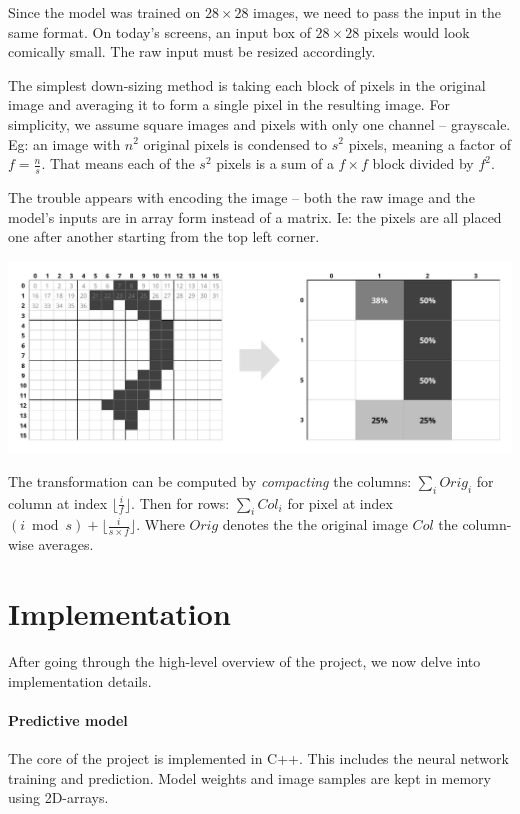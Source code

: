 \documentclass[a4paper]{article}
\newcommand{\floor}[1]{\lfloor {#1} \rfloor}
\begin{document}
\noindent Since the model was trained on $28 \times 28$ images, we need to pass the input in the same format. On today's screens, an input box of $28 \times 28$ pixels would look comically small. The raw input must be resized accordingly.

The simplest down-sizing method is taking each block of pixels in the original image and averaging it to form a single pixel in the resulting image. For simplicity, we assume square images and pixels with only one channel -- grayscale. Eg: an image with $n^2$ original pixels is condensed to $s^2$ pixels, meaning a factor of $f=\frac{n}{s}$. That means each of the $s^2$ pixels is a sum of a $f \times f$ block divided by $f^2$.

The trouble appears with encoding the image -- both the raw image and the model's inputs are in array form instead of a matrix. Ie: the pixels are all placed one after another starting from the top left corner.

\begin{center}
\includegraphics[width=\textwidth]{images/resize.png}
\end{center}

The transformation can be computed by \textit{compacting} the columns:
$\sum_i Orig_i$ for column at index $\floor{\frac{i}{f}}$. Then for rows: $\sum_i Col_i$ for pixel at index $(i \bmod s) + \floor{\frac{i}{s \times f}}$. Where $Orig$ denotes the the original image $Col$ the column-wise averages. 







\newpage
\section{Implementation}
After going through the high-level overview of the project, we now delve into implementation details.

\paragraph{Predictive model} The core of the project is implemented in C++. This includes the neural network training and prediction. Model weights and image samples are kept in memory using 2D-arrays. 
\end{document}
